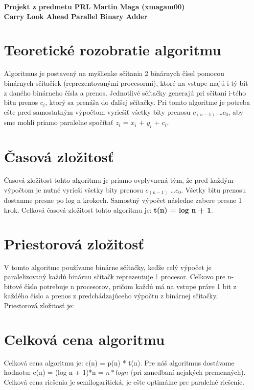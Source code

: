 \documentclass[11pt,a4paper,titlepage,final]{article}
\begin{document}
\raggedright\large{\textbf{Projekt z predmetu PRL Martin Maga (xmagam00) \\Carry Look Ahead Parallel Binary Adder}}

\section{Teoretické rozobratie algoritmu}
Algoritmus je postavený na myšlienke sčítania 2 binárnych čísel pomocou binárnych sčítačiek (reprezentovanými procesormi), ktoré na vstupe majú i-tý bit z daného binárneho čísla a prenos. Jednotlivé sčítačky generajú pri sčitaní i-tého bitu prenos $c_i$, ktorý sa prenáša do ďalšej sčítačky. Pri tomto algoritme je potreba ešte pred samostatným výpočtom vyriešiť všetky bity prenosu $c_(n-1)$ \ldots $c_0$, aby sme mohli priamo paralelne spočítať $z_i$ = $x_i$ + $y_i$ + $c_i$.


\section{Časová zložitosť}
Časová zložitosť tohto algoritmu je priamo ovplyvnená tým, že pred každým výpočtom je nutné vyrieši všetky bity prenosu $c_(n-1)$ \ldots $c_0$. Všetky bitu prenosu dostanme presne po log n krokoch. Samostný výpočet následne zabere presne 1 krok. Celková časová zložitosť tohto algoritmu je: \textbf{t(n) = log n + 1}.

\section{Priestorová zložitosť}
V tomto algoritme používame binárne sčítačky, keďže celý výpočet je paralelizovaný každú binárnu sčítačk reprezentuje 1 procesor. Celkovo pre n-bitové číslo potrebuje n procesorov, pričom každú má na vstupe práve 1 bit z každého číslo a prenos z predchádzajúceho výpočtu z binárnej sčítačky. Priestorová zložitosť je: 


\section{Celková cena algoritmu}
Celková cena algoritmu je: c(n) = p(n) * t(n). Pre náš algoritmus dostávame hodnotu: c(n) = (log n + 1)*n = $n * log n$ (pri zanedbaní nejakých premenných). Celková cena riešenia je semilogaritická, je ešte optimálne pre paralelné riešenie.
\end{document}
